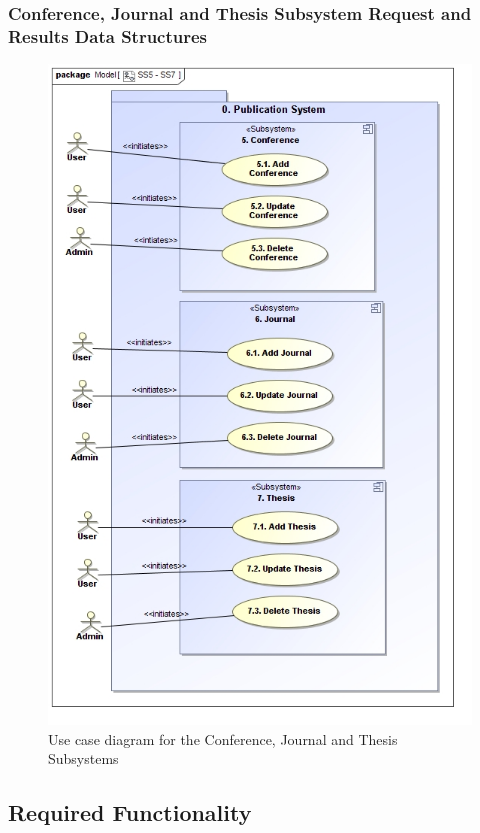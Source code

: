 \documentclass{article}
\begin{document}
			\subsubsection{Conference, Journal and Thesis Subsystem Request and Results Data Structures}
				\begin{figure}
					\includegraphics[width=\textwidth]{SS5-SS7}
					\caption{Use case diagram for the Conference, Journal and Thesis Subsystems}
				\end{figure}
		\subsection{Required Functionality}
\end{document}
